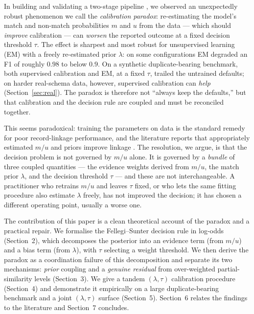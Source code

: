 \documentclass[11pt]{article}
\begin{document}
In building and validating a two-stage pipeline \cite{pipeline}, we observed an unexpectedly robust
phenomenon we call the \emph{calibration paradox}: re-estimating the model's match and
non-match probabilities $m$ and $u$ from the data --- which should \emph{improve}
calibration --- can \emph{worsen} the reported outcome at a fixed decision threshold $\tau$.
The effect is sharpest and most robust for unsupervised learning (EM) with a freely
re-estimated prior $\lambda$: on some configurations EM degraded an F1 of roughly $0.98$ to
below $0.9$. On a synthetic duplicate-bearing benchmark, both supervised calibration and EM,
at a fixed $\tau$, trailed the untrained defaults; on harder real-schema data, however,
supervised calibration can \emph{help} (Section~\ref{sec:real}). The paradox is therefore
not ``always keep the defaults,'' but that calibration and the decision rule are coupled
and must be reconciled together.

This seems paradoxical: training the parameters on data is the standard remedy for poor
record-linkage performance, and the literature reports that appropriately estimated $m/u$
and priors improve linkage \cite{winkler1993,winkler2000}. The resolution, we argue, is
that the decision problem is not governed by $m/u$ alone. It is governed by a \emph{bundle}
of three coupled quantities --- the evidence weights derived from $m/u$, the match prior
$\lambda$, and the decision threshold $\tau$ --- and these are not interchangeable. A
practitioner who retrains $m/u$ and leaves $\tau$ fixed, or who lets the same fitting
procedure also estimate $\lambda$ freely, has not improved the decision; it has chosen a
different operating point, usually a worse one.

The contribution of this paper is a clean theoretical account of the paradox and a practical
repair. We formalise the Fellegi--Sunter decision rule in log-odds (Section~2), which
decomposes the posterior into an evidence term (from $m/u$) and a bias term (from
$\lambda$), with $\tau$ selecting a weight threshold. We then derive the paradox as a
coordination failure of this decomposition and separate its two mechanisms: \emph{prior}
coupling and a \emph{genuine residual} from over-weighted partial-similarity levels
(Section~3). We give a tandem $(\lambda,\tau)$ calibration procedure (Section~4) and
demonstrate it empirically on a large duplicate-bearing benchmark and a joint
$(\lambda,\tau)$ surface (Section~5). Section~6 relates the findings to the literature and
Section~7 concludes.
\end{document}
